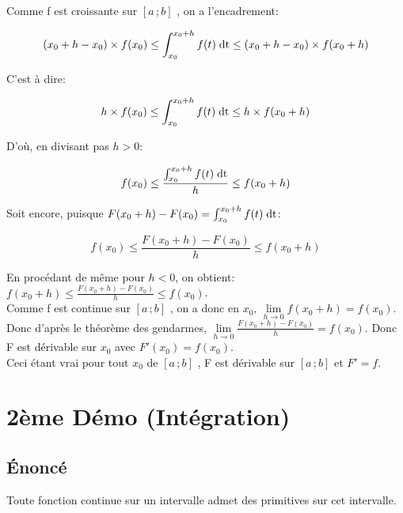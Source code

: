 \documentclass[12px]{article}
\newcommand\I{$[a\,;b]$ }
\begin{document}
	Comme f est croissante sur \I, on a l'encadrement:
	\begin{center}
		\begin{displaymath}
			(x_0 +h -x_0 ) \times f(x_0) 
				\leq 
			\int_{x_0}^{x_0 +h}f(t)\; \mathrm{dt} 
				\leq 
			(x_0 +h -x_0) \times f(x_0 +h)
		\end{displaymath}
	\end{center}
	C'est à dire:
	\begin{center}
		\begin{displaymath}
			h \times f(x_0) 
			\leq 
			\int_{x_0}^{x_0 +h}f(t)\; \mathrm{dt} 
			\leq 
			h \times f(x_0 +h)
		\end{displaymath}
	\end{center}
	D'où, en divisant pas $h>0$:
	\begin{center}
		\begin{displaymath}
			f(x_0) \leq \frac{\int_{x_0}^{x_0 +h}f(t)\; \mathrm{dt}}{h} \leq f(x_0 +h)
		\end{displaymath}
	\end{center}
	Soit encore, puisque $F(x_0 +h) - F(x_0) = \int_{x_0}^{x_0 +h}f(t)\; \mathrm{dt}$:
	\begin{center}
		\begin{displaymath}
			f(x_0) \leq \frac{F(x_0 +h) - F(x_0)}{h} \leq f(x_0 +h)
		\end{displaymath}
	\end{center}
	En procédant de même pour $h<0$, on obtient:
	$f(x_0 +h) \leq \frac{F(x_0 +h) - F(x_0)}{h} \leq f(x_0)$.\\
	Comme f est continue sur \I, on a donc en $x_0,\, \lim\limits_{h \rightarrow 0} f(x_0 +h) = f(x_0)$.\\
	Donc d'après le théorème des gendarmes, 
	$\lim\limits_{h \rightarrow 0}\frac{F(x_0 +h) - F(x_0)}{h} = f(x_0)$.
	Donc F est dérivable sur $x_0$ avec $F'(x_0) = f(x_0)$.\\
	Ceci étant vrai pour tout $x_0$ de \I, F est dérivable sur \I et $F'=f$.
	
	
	\section{2ème Démo (Intégration)}
	
	\subsection{\'Enoncé}
	Toute fonction continue sur un intervalle admet des primitives sur cet intervalle.
	
\end{document}
